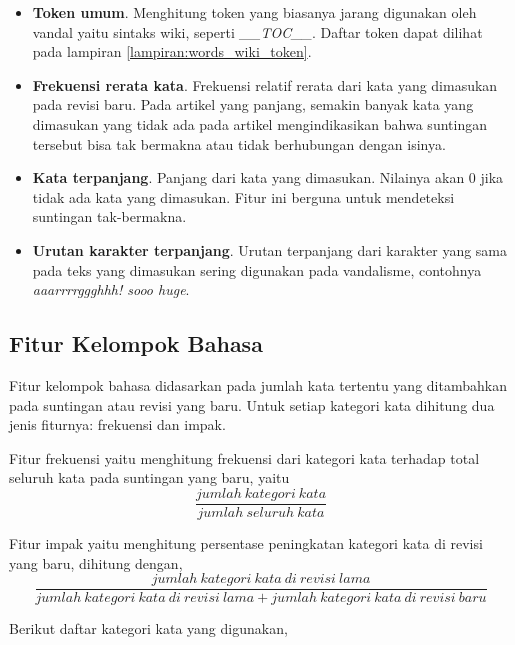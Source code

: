 \begin{itemize}
\item \textbf{Token umum}.
Menghitung token yang biasanya jarang digunakan oleh vandal yaitu sintaks
wiki, seperti \textit{\_\_TOC\_\_}. Daftar token dapat dilihat pada lampiran
\ref{lampiran:words_wiki_token}.

\item \textbf{Frekuensi rerata kata}.
Frekuensi relatif rerata dari kata yang dimasukan pada revisi baru.
Pada artikel yang panjang, semakin banyak kata yang dimasukan yang tidak ada
pada artikel mengindikasikan bahwa suntingan tersebut bisa tak bermakna atau
tidak berhubungan dengan isinya.

\item \textbf{Kata terpanjang}.
Panjang dari kata yang dimasukan.
Nilainya akan 0 jika tidak ada kata yang dimasukan.
Fitur ini berguna untuk mendeteksi suntingan tak-bermakna.

\item \textbf{Urutan karakter terpanjang}.
Urutan terpanjang dari karakter yang sama pada teks yang dimasukan sering
digunakan pada vandalisme, contohnya \textit{aaarrrrggghhh! sooo huge}.

\end{itemize}

\subsection{Fitur Kelompok Bahasa}

Fitur kelompok bahasa didasarkan pada jumlah kata tertentu yang ditambahkan
pada suntingan atau revisi yang baru.
Untuk setiap kategori kata dihitung dua jenis fiturnya: frekuensi dan impak.

Fitur frekuensi yaitu menghitung frekuensi dari kategori kata terhadap
total seluruh kata pada suntingan yang baru, yaitu
\[
	\frac{jumlah\ kategori\ kata}
		{jumlah\ seluruh\ kata}
\]

Fitur impak yaitu menghitung persentase peningkatan kategori kata di revisi
yang baru, dihitung dengan,
\[
	\frac{jumlah\ kategori\ kata\ di\ revisi\ lama}
		{jumlah\ kategori\ kata\ di\ revisi\ lama +
		jumlah\ kategori\ kata\ di\ revisi\ baru}
\]

Berikut daftar kategori kata yang digunakan,

